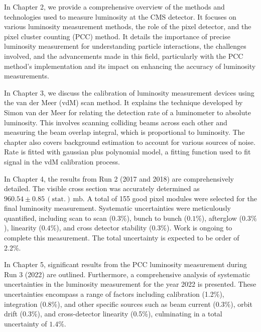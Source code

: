 In Chapter 2, we provide a comprehensive overview of the methods and technologies used to measure luminosity at the CMS detector. It focuses on various luminosity measurement methods, the role of the pixel detector, and the pixel cluster counting (PCC) method. It details the importance of precise luminosity measurement for understanding particle interactions, the challenges involved, and the advancements made in this field, particularly with the PCC method's implementation and its impact on enhancing the accuracy of luminosity measurements.

In Chapter 3, we discuss the calibration of luminosity measurement devices using the van der Meer (vdM) scan method. It explains the technique developed by Simon van der Meer for relating the detection rate of a luminometer to absolute luminosity. This involves scanning colliding beams across each other and measuring the beam overlap integral, which is proportional to luminosity. The chapter also covers background estimation to account for various sources of noise. Rate is fitted with gaussian plus polynomial model, a fitting function used to fit signal in the vdM calibration process.

In Chapter 4, the results from Run 2 (2017 and 2018) are comprehensively detailed. %
The visible cross section was accurately determined as \(960.54 \pm 0.85 \, (\text{stat.}) \, \text{mb}\). A total of 155 good pixel modules were selected for the final luminosity measurement. Systematic uncertainties were meticulously quantified, including scan to scan (\(0.3\%\)), bunch to bunch (\(0.1\%\)), afterglow (\(0.3\%\)), linearity (\(0.4\%\)), and cross detector stability (\(0.3\%\)). Work is ongoing to complete this measurement. The total uncertainty is expected to be order of 2.2\%. 

In Chapter 5, significant results from the PCC luminosity measurement during Run 3 (2022) are outlined. %
Furthermore, a comprehensive analysis of systematic uncertainties in the luminosity measurement for the year 2022 is presented. These uncertainties encompass a range of factors including calibration (1.2\%), integration (0.8\%), and other specific sources such as beam current (0.3\%), orbit drift (0.3\%), and cross-detector linearity (0.5\%), culminating in a total uncertainty of \(1.4\%\).

